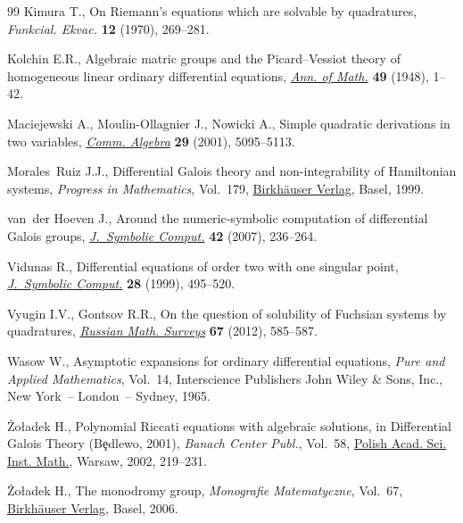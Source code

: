 \documentclass[11pt]{article}
\numberwithin{equation}{section}
\let\SourceCedilla\c
\renewcommand{\c}[1]{{\AccentFallback\SourceCedilla{#1}}}
\begin{document}
\begin{thebibliography}{99}
Kimura T., On {R}iemann's equations which are solvable by quadratures,
 \textit{Funkcial. Ekvac.} \textbf{12} (1970), 269--281.

Kolchin E.R., Algebraic matric groups and the {P}icard--{V}essiot theory of
 homogeneous linear ordinary differential equations, \href{https://doi.org/10.2307/1969111}{\textit{Ann. of Math.}}
 \textbf{49} (1948), 1--42.

Maciejewski A., Moulin-Ollagnier J., Nowicki A., Simple quadratic derivations
 in two variables, \href{https://doi.org/10.1081/AGB-100106804}{\textit{Comm. Algebra}} \textbf{29} (2001), 5095--5113.

Morales~Ruiz J.J., Differential {G}alois theory and non-integrability of
 {H}amiltonian systems, \textit{Progress in Mathematics}, Vol.~179,
 \href{https://doi.org/10.1007/978-3-0348-8718-2}{Birkh\"{a}user Verlag}, Basel, 1999.

van~der Hoeven J., Around the numeric-symbolic computation of differential
 {G}alois groups, \href{https://doi.org/10.1016/j.jsc.2006.03.007}{\textit{J.~Symbolic Comput.}} \textbf{42} (2007), 236--264.

Vidunas R., Differential equations of order two with one singular point,
 \href{https://doi.org/10.1006/jsco.1999.0312}{\textit{J.~Symbolic Comput.}} \textbf{28} (1999), 495--520.

Vyugin I.V., Gontsov R.R., On the question of solubility of {F}uchsian systems
 by quadratures, \href{https://doi.org/10.1070/RM2012v067n03ABEH004801}{\textit{Russian Math. Surveys}} \textbf{67} (2012), 585--587.

Wasow W., Asymptotic expansions for ordinary differential equations,
 \textit{Pure and Applied Mathematics}, Vol.~14, Interscience Publishers John
 Wiley \& Sons, Inc., New York~-- London~-- Sydney, 1965.

\.{Z}o{\l}adek H., Polynomial {R}iccati equations with algebraic solutions, in
 Differential {G}alois Theory ({B}\c{e}dlewo, 2001), \textit{Banach Center
 Publ.}, Vol.~58, \href{https://doi.org/10.4064/bc58-0-17}{Polish Acad. Sci. Inst. Math.}, Warsaw, 2002, 219--231.

\.{Z}o{\l}adek H., The monodromy group, \textit{Monografie Matematyczne},
 Vol.~67, \href{https://doi.org/10.1007/3-7643-7536-1}{Birkh\"{a}user Verlag}, Basel, 2006.

\end{thebibliography}
\end{document}
